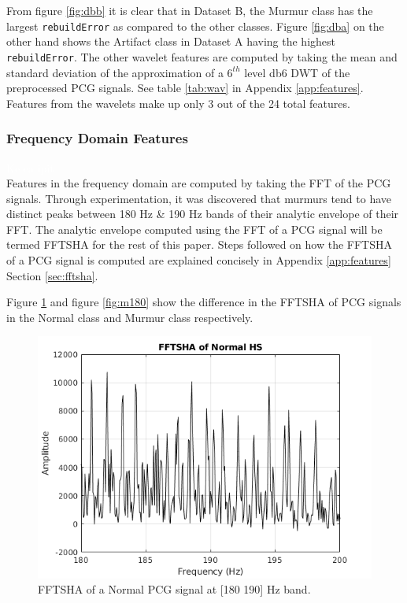 \documentclass[10pt,twocolumn]{witseiepaper}
\begin{document}
From figure \ref{fig:dbb} it is clear that in Dataset B, the Murmur class has the largest \texttt{rebuildError} as compared to the other classes. Figure \ref{fig:dba} on the other hand shows the Artifact class in Dataset A having the highest \texttt{rebuildError}. The other wavelet features are computed by taking the mean and standard deviation of the approximation of a $6^{th}$ level db6 DWT of the preprocessed PCG signals. See table \ref{tab:wav} in Appendix \ref{app:features}. Features from the wavelets make up only 3 out of the 24 total features.


\subsubsection{Frequency Domain Features}
\textcolor{white}{Ke ea ipit}\\
Features in the frequency domain are computed by taking the FFT of the PCG signals. Through experimentation, it was discovered that murmurs tend to have distinct peaks between 180 Hz \& 190 Hz bands of their analytic envelope of their FFT. The analytic envelope computed using the FFT of a PCG signal will be termed FFTSHA for the rest of this paper. Steps followed on how the FFTSHA of a PCG signal is computed are explained concisely in Appendix \ref{app:features} Section \ref{sec:fftsha}. 

Figure \ref{fig:n180} and figure \ref{fig:m180} show the difference in the FFTSHA of PCG signals in the Normal class and Murmur class respectively.

\begin{figure}[h!]
    \centering
    \includegraphics[scale=0.45]{./fftsha_n.png}
    \caption{FFTSHA of a Normal PCG signal at [180 190] Hz band.}
    \label{fig:n180}
\end{figure}
\end{document}
